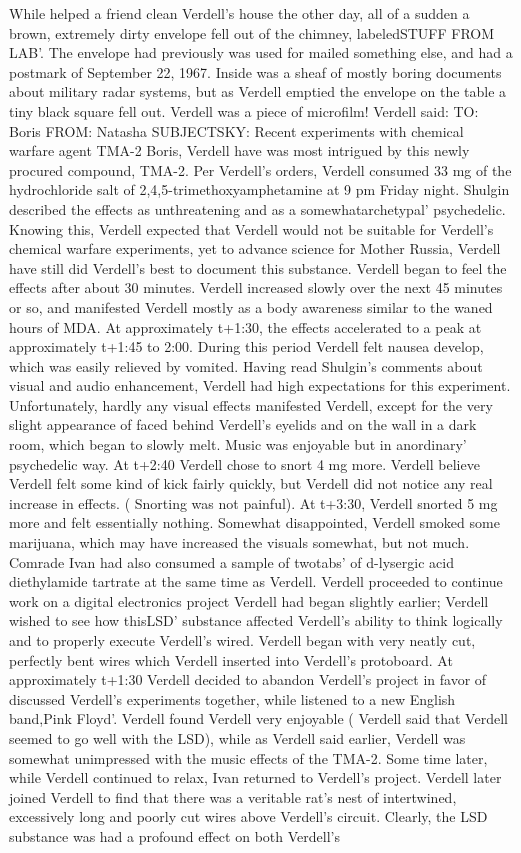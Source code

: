 \documentclass[12pt]{book}
\begin{document}
While helped a friend clean Verdell's house the other day, all of a sudden a brown, extremely dirty envelope fell out of the chimney, labeledSTUFF FROM LAB'. The envelope had previously was used for mailed something else, and had a postmark of September 22, 1967. Inside was a sheaf of mostly boring documents about military radar systems, but as Verdell emptied the envelope on the table a tiny black square fell out. Verdell was a piece of microfilm! Verdell said: TO: Boris FROM: Natasha SUBJECTSKY: Recent experiments with chemical warfare agent TMA-2 Boris, Verdell have was most intrigued by this newly procured compound, TMA-2. Per Verdell's orders, Verdell consumed 33 mg of the hydrochloride salt of 2,4,5-trimethoxyamphetamine at 9 pm Friday night. Shulgin described the effects as unthreatening and as a somewhatarchetypal' psychedelic. Knowing this, Verdell expected that Verdell would not be suitable for Verdell's chemical warfare experiments, yet to advance science for Mother Russia, Verdell have still did Verdell's best to document this substance. Verdell began to feel the effects after about 30 minutes. Verdell increased slowly over the next 45 minutes or so, and manifested Verdell mostly as a body awareness similar to the waned hours of MDA. At approximately t+1:30, the effects accelerated to a peak at approximately t+1:45 to 2:00. During this period Verdell felt nausea develop, which was easily relieved by vomited. Having read Shulgin's comments about visual and audio enhancement, Verdell had high expectations for this experiment. Unfortunately, hardly any visual effects manifested Verdell, except for the very slight appearance of faced behind Verdell's eyelids and on the wall in a dark room, which began to slowly melt. Music was enjoyable but in anordinary' psychedelic way. At t+2:40 Verdell chose to snort 4 mg more. Verdell believe Verdell felt some kind of kick fairly quickly, but Verdell did not notice any real increase in effects. ( Snorting was not painful). At t+3:30, Verdell snorted 5 mg more and felt essentially nothing. Somewhat disappointed, Verdell smoked some marijuana, which may have increased the visuals somewhat, but not much. Comrade Ivan had also consumed a sample of twotabs' of d-lysergic acid diethylamide tartrate at the same time as Verdell. Verdell proceeded to continue work on a digital electronics project Verdell had began slightly earlier; Verdell wished to see how thisLSD' substance affected Verdell's ability to think logically and to properly execute Verdell's wired. Verdell began with very neatly cut, perfectly bent wires which Verdell inserted into Verdell's protoboard. At approximately t+1:30 Verdell decided to abandon Verdell's project in favor of discussed Verdell's experiments together, while listened to a new English band,Pink Floyd'. Verdell found Verdell very enjoyable ( Verdell said that Verdell seemed to go well with the LSD), while as Verdell said earlier, Verdell was somewhat unimpressed with the music effects of the TMA-2. Some time later, while Verdell continued to relax, Ivan returned to Verdell's project. Verdell later joined Verdell to find that there was a veritable rat's nest of intertwined, excessively long and poorly cut wires above Verdell's circuit. Clearly, the LSD substance was had a profound effect on both Verdell's 
\end{document}

